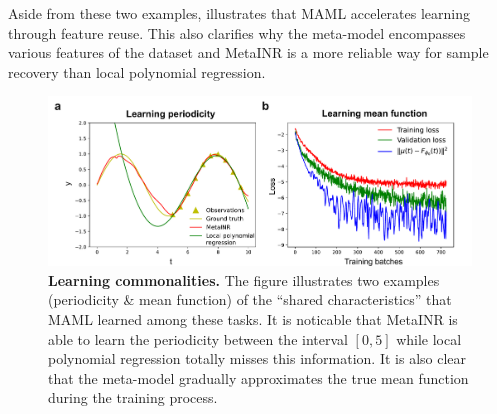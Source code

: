 \documentclass{article}
\begin{document}
{Aside from these two examples, \cite{raghu2019rapid}  illustrates that MAML accelerates learning through feature reuse.}
This also clarifies why the meta-model encompasses various features of the dataset and MetaINR is a more reliable way for sample recovery than local polynomial regression. 
\begin{figure}[htb]
  \centering
  \includegraphics[width=\textwidth]{learning_commonalities.pdf}
  \caption{\textbf{Learning commonalities.} The figure illustrates two examples (periodicity \& mean function) of the ``shared characteristics'' that MAML learned among these tasks. 
  It is noticable that MetaINR is able to learn the periodicity between the interval $[0,5]$ while local polynomial regression totally misses this information. It is also clear that the meta-model gradually approximates the true mean function during the training process. }
  \label{Learning commonalities}
\end{figure}



\end{document}

